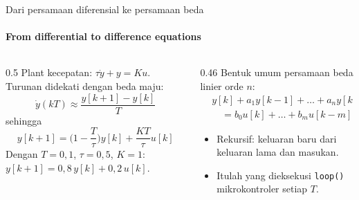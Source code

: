 \documentclass[aspectratio=169,10pt]{beamer}
\begin{document}
\begin{frame}{Dari persamaan diferensial ke persamaan beda}
	\framesubtitle{From differential to difference equations}
	\begin{columns}[T]
		\begin{column}{0.5\textwidth}
			\small
			Plant kecepatan: $\tau\dot y + y = Ku$. Turunan didekati dengan beda maju:
			\[
				\dot y(kT) \approx \frac{y[k+1]-y[k]}{T}
			\]
			sehingga
			\[
				y[k+1] = \Big(1-\frac{T}{\tau}\Big)y[k] + \frac{KT}{\tau}u[k]
			\]
			Dengan $T=0{,}1$, $\tau=0{,}5$, $K=1$: $y[k+1] = 0{,}8\,y[k] + 0{,}2\,u[k]$.
		\end{column}
		\begin{column}{0.46\textwidth}
			\small
			Bentuk umum persamaan beda linier orde $n$:
			\begin{align*}
				&y[k] + a_1y[k-1] + \dots + a_ny[k-n]\\
				&\quad = b_0u[k] + \dots + b_mu[k-m]
			\end{align*}
			\begin{itemize}
				\item Rekursif: keluaran baru dari keluaran lama dan masukan.
				\item Itulah yang dieksekusi \texttt{loop()} mikrokontroler setiap $T$.
			\end{itemize}
		\end{column}
	\end{columns}
\end{frame}
\end{document}
